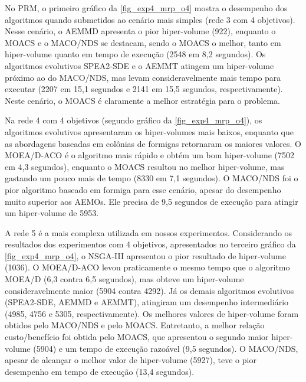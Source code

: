 No PRM, o primeiro gráfico da \autoref{fig_exp4_mrp_o4} mostra o desempenho dos algoritmos quando submetidos ao cenário mais simples (rede 3 com 4 objetivos). Nesse cenário, o AEMMD apresenta o pior hiper-volume (922), enquanto o MOACS e o MACO/NDS se destacam, sendo o MOACS o melhor, tanto em hiper-volume quanto em tempo de execução (2548 em 8,2 segundos). Os algoritmos evolutivos SPEA2-SDE e o AEMMT atingem um hiper-volume próximo ao do MACO/NDS, mas levam consideravelmente mais tempo para executar (2207 em 15,1 segundos e 2141 em 15,5 segundos, respectivamente). Neste cenário, o MOACS é claramente a melhor estratégia para o problema.

Na rede 4 com 4 objetivos (segundo gráfico da \autoref{fig_exp4_mrp_o4}), os algoritmos evolutivos apresentaram os hiper-volumes mais baixos, enquanto que as abordagens baseadas em colônias de formigas retornaram os maiores valores. O MOEA/D-ACO é o algoritmo mais rápido e obtém um bom hiper-volume (7502 em 4,3 segundos), enquanto o MOACS resultou no melhor hiper-volume, mas gastando um pouco mais de tempo (8330 em 7,1 segundos). O MACO/NDS foi o pior algoritmo baseado em formiga para esse cenário, apesar do desempenho muito superior aos AEMOs. Ele precisa de 9,5 segundos de execução para atingir um hiper-volume de 5953.

A rede 5 é a mais complexa utilizada em nossos experimentos. Considerando os resultados dos experimentos com 4 objetivos, apresentados no terceiro gráfico da \autoref{fig_exp4_mrp_o4}, o NSGA-III apresentou o pior resultado de hiper-volume (1036). O MOEA/D-ACO levou praticamente o mesmo tempo que o algoritmo MOEA/D (6,3 contra 6,5 segundos), mas obteve um hiper-volume consideravelmente maior (5904 contra 4292). Já os demais algoritmos evolutivos (SPEA2-SDE, AEMMD e AEMMT), atingiram um desempenho intermediário (4985, 4756 e 5305, respectivamente). Os melhores valores de hiper-volume foram obtidos pelo MACO/NDS e pelo MOACS. Entretanto, a melhor relação custo/benefício foi obtida pelo MOACS, que apresentou o segundo maior hiper-volume (5904) e um tempo de execução razoável (9,5 segundos). O MACO/NDS, apesar de alcançar o melhor valor de hiper-volume (5927), teve o pior desempenho em tempo de execução (13,4 segundos).

